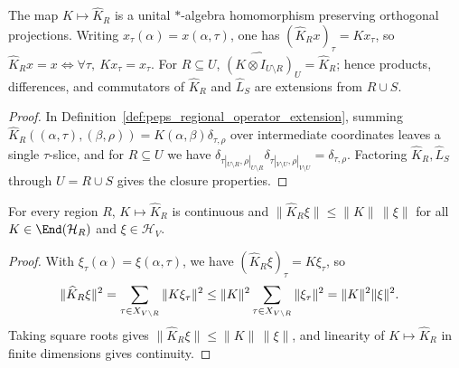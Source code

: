 \begin{lemma}%
    \label{thm:peps_regional_extension_algebra}
    \leanok
    The map $K\mapsto\widehat K_R$ is a unital $*$-algebra homomorphism
    preserving orthogonal projections. Writing $x_\tau(\alpha)=x(\alpha,\tau)$,
    one has $(\widehat K_Rx)_\tau=Kx_\tau$, so
    $\widehat K_Rx=x\iff \forall\tau,\ Kx_\tau=x_\tau$.
    For $R\subseteq U$, $\widehat{(K\otimes I_{U\setminus R})}_U=\widehat K_R$;
    hence products, differences, and commutators of $\widehat K_R$ and
    $\widehat L_S$ are extensions from $R\cup S$.
\end{lemma}
\begin{proof}\leanok
    In Definition~\ref{def:peps_regional_operator_extension}, summing
    $\widehat K_R((\alpha,\tau),(\beta,\rho))=K(\alpha,\beta)\delta_{\tau,\rho}$
    over intermediate coordinates leaves a single $\tau$-slice, and for
    $R\subseteq U$ we have $\delta_{\tau|_{U\setminus R},\rho|_{U\setminus R}}
        \delta_{\tau|_{V\setminus U},\rho|_{V\setminus U}}=\delta_{\tau,\rho}$.
    Factoring $\widehat K_R,\widehat L_S$ through $U=R\cup S$ gives the closure
    properties.
\end{proof}

\begin{lemma}%
    \label{thm:peps_regional_extension_norm}
    \leanok
    For every region $R$, $K\mapsto\widehat K_R$ is continuous and
    $\|\widehat K_R\xi\|\le\|K\|\,\|\xi\|$ for all $K\in\End(\mathcal H_R)$ and
    $\xi\in\mathcal H_V$.
\end{lemma}
\begin{proof}\leanok
    With $\xi_\tau(\alpha)=\xi(\alpha,\tau)$, we have
    $(\widehat K_R\xi)_\tau=K\xi_\tau$, so
    \begin{align}
        \|\widehat K_R\xi\|^2
         & =\sum_{\tau\in X_{V\setminus R}}\|K\xi_\tau\|^2
        \le\|K\|^2\sum_{\tau\in X_{V\setminus R}}\|\xi_\tau\|^2
        =\|K\|^2\|\xi\|^2.
        \notag
    \end{align}
    Taking square roots gives $\|\widehat K_R\xi\|\le\|K\|\,\|\xi\|$, and
    linearity of $K\mapsto\widehat K_R$ in finite dimensions gives continuity.
\end{proof}

